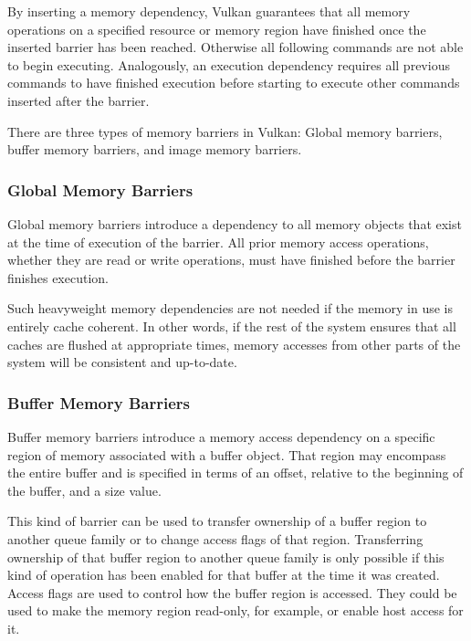       By inserting a memory dependency, Vulkan guarantees that all memory operations on a specified resource or memory region have finished once the inserted barrier has been reached.
      Otherwise all following commands are not able to begin executing.
      Analogously, an execution dependency requires all previous commands to have finished execution before starting to execute other commands inserted after the barrier.

      There are three types of memory barriers in Vulkan: Global memory barriers, buffer memory barriers, and image memory barriers.

      \subsubsection{Global Memory Barriers}
        Global memory barriers introduce a dependency to all memory objects that exist at the time of execution of the barrier.
        All prior memory access operations, whether they are read or write operations, must have finished before the barrier finishes execution.

        Such heavyweight memory dependencies are not needed if the memory in use is entirely cache coherent.
        In other words, if the rest of the system ensures that all caches are flushed at appropriate times, memory accesses from other parts of the system will be consistent and up-to-date.

      \subsubsection{Buffer Memory Barriers}
        Buffer memory barriers introduce a memory access dependency on a specific region of memory associated with a buffer object.
        That region may encompass the entire buffer and is specified in terms of an offset, relative to the beginning of the buffer, and a size value.

        This kind of barrier can be used to transfer ownership of a buffer region to another queue family or to change access flags of that region.
        Transferring ownership of that buffer region to another queue family is only possible if this kind of operation has been enabled for that buffer at the time it was created.
        Access flags are used to control how the buffer region is accessed.
        They could be used to make the memory region read-only, for example, or enable \gls{host} access for it.

